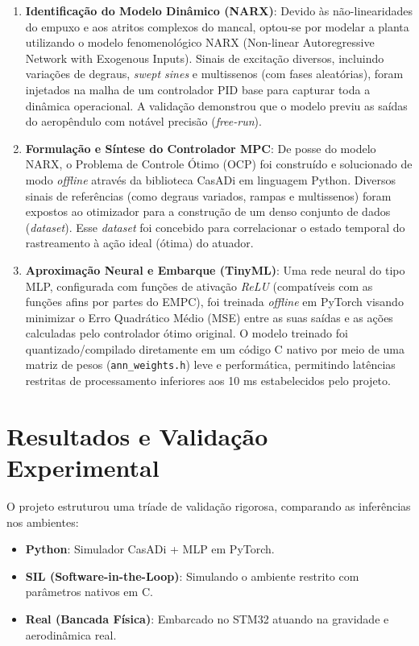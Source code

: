 \documentclass[12pt,a4paper]{article}
\begin{document}
\begin{enumerate}
    \item \textbf{Identificação do Modelo Dinâmico (NARX)}: Devido às não-linearidades do empuxo e aos atritos complexos do mancal, optou-se por modelar a planta utilizando o modelo fenomenológico NARX (Non-linear Autoregressive Network with Exogenous Inputs). Sinais de excitação diversos, incluindo variações de degraus, \textit{swept sines} e multissenos (com fases aleatórias), foram injetados na malha de um controlador PID base para capturar toda a dinâmica operacional. A validação demonstrou que o modelo previu as saídas do aeropêndulo com notável precisão (\textit{free-run}).
    
    \item \textbf{Formulação e Síntese do Controlador MPC}: De posse do modelo NARX, o Problema de Controle Ótimo (OCP) foi construído e solucionado de modo \textit{offline} através da biblioteca CasADi em linguagem Python. Diversos sinais de referências (como degraus variados, rampas e multissenos) foram expostos ao otimizador para a construção de um denso conjunto de dados (\textit{dataset}). Esse \textit{dataset} foi concebido para correlacionar o estado temporal do rastreamento à ação ideal (ótima) do atuador.
    
    \item \textbf{Aproximação Neural e Embarque (TinyML)}: Uma rede neural do tipo MLP, configurada com funções de ativação \textit{ReLU} (compatíveis com as funções afins por partes do EMPC), foi treinada \textit{offline} em PyTorch visando minimizar o Erro Quadrático Médio (MSE) entre as suas saídas e as ações calculadas pelo controlador ótimo original. O modelo treinado foi quantizado/compilado diretamente em um código C nativo por meio de uma matriz de pesos (\texttt{ann\_weights.h}) leve e performática, permitindo latências restritas de processamento inferiores aos 10 ms estabelecidos pelo projeto.
\end{enumerate}

\section{Resultados e Validação Experimental}

O projeto estruturou uma tríade de validação rigorosa, comparando as inferências nos ambientes:
\begin{itemize}
    \item \textbf{Python}: Simulador CasADi + MLP em PyTorch.
    \item \textbf{SIL (Software-in-the-Loop)}: Simulando o ambiente restrito com parâmetros nativos em C.
    \item \textbf{Real (Bancada Física)}: Embarcado no STM32 atuando na gravidade e aerodinâmica real.
\end{itemize}
\end{document}
